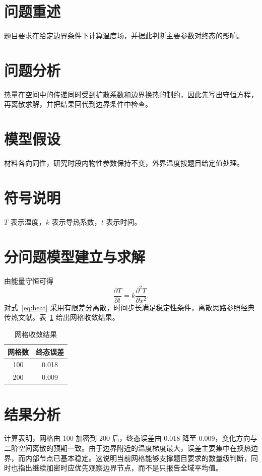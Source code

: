 \documentclass{ctexart}
\begin{document}
\begin{abstract}
本文针对连续介质中的传热过程建立机理模型，并用守恒关系、数值求解与误差检验形成闭环。
\end{abstract}

\section{问题重述}
题目要求在给定边界条件下计算温度场，并据此判断主要参数对终态的影响。

\section{问题分析}
热量在空间中的传递同时受到扩散系数和边界换热的制约，因此先写出守恒方程，再离散求解，并把结果回代到边界条件中检查。

\section{模型假设}
材料各向同性，研究时段内物性参数保持不变，外界温度按题目给定值处理。

\section{符号说明}
$T$ 表示温度，$k$ 表示导热系数，$t$ 表示时间。

\section{分问题模型建立与求解}
由能量守恒可得
\begin{equation}
  \frac{\partial T}{\partial t}=k\frac{\partial^2T}{\partial x^2}.
  \label{eq:heat}
\end{equation}
对式~\eqref{eq:heat} 采用有限差分离散，时间步长满足稳定性条件，离散思路参照经典传热文献\cite{heat}。表~\ref{tab:grid} 给出网格收敛结果。
\begin{table}[htbp]
  \centering
  \caption{网格收敛结果}\label{tab:grid}
  \begin{tabular}{cc}
    \hline
    网格数 & 终态误差 \\
    \hline
    100 & 0.018 \\
    200 & 0.009 \\
    \hline
  \end{tabular}
\end{table}

\section{结果分析}
计算表明，网格由 100 加密到 200 后，终态误差由 0.018 降至 0.009，变化方向与二阶空间离散的预期一致。由于边界附近的温度梯度最大，误差主要集中在换热边界，而内部节点已基本稳定。这说明当前网格能够支撑题目要求的数量级判断，同时也指出继续加密时应优先观察边界节点，而不是只报告全域平均值。
\end{document}
